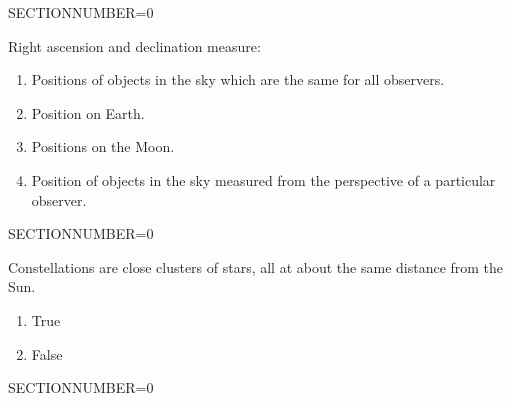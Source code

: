 \documentclass[11pt]{article}
\begin{document}
\begin{enumerate}
\begin{minipage}{\textwidth}
\begin{minipage}{\textwidth}
\end{minipage}
SECTIONNUMBER=0
\end{minipage}
\vskip 0.20in

\begin{minipage}{\textwidth}
\begin{minipage}{\textwidth}
\item Right ascension and declination measure:
\begin{enumerate} 
\setlength{\itemsep}{1pt} 
\setlength{\parskip}{0pt} 
\setlength{\parsep}{0pt}
\setlength{\multicolsep}{1pt} 
\item Positions of objects in the sky which are the same for all observers.
\item Position on Earth.
\item Positions on the Moon.
\item Position of objects in the sky measured from the perspective of a particular observer.
\end{enumerate} 
\end{minipage}
SECTIONNUMBER=0
\end{minipage}
\vskip 0.20in

\begin{minipage}{\textwidth}
\begin{minipage}{\textwidth}
\item Constellations are close clusters of stars, all at about the same distance from the Sun.
\begin{multicols}{3}
\begin{enumerate} 
\setlength{\itemsep}{1pt} 
\setlength{\parskip}{0pt} 
\setlength{\parsep}{0pt}
\setlength{\multicolsep}{1pt} 
\item True
\item False
\end{enumerate} 
\vfill 
\end{multicols}

\end{minipage}
SECTIONNUMBER=0
\end{minipage}
\vskip 0.20in

\end{enumerate}
\end{document}
